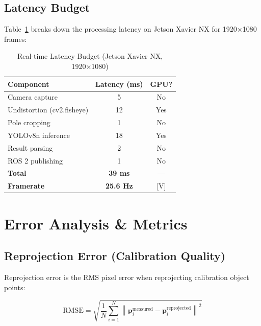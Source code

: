 \documentclass[11pt,a4paper,oneside]{article}
\begin{document}
\subsection{Latency Budget}

Table~\ref{tab:latency} breaks down the processing latency on Jetson Xavier NX for 1920×1080 frames:

\begin{table}[h]
\centering
\caption{Real-time Latency Budget (Jetson Xavier NX, 1920×1080)}
\label{tab:latency}
\begin{tabular}{lcc}
\toprule
\textbf{Component} & \textbf{Latency (ms)} & \textbf{GPU?} \\
\midrule
Camera capture & 5 & No \\
Undistortion (cv2.fisheye) & 12 & Yes \\
Pole cropping & 1 & No \\
YOLOv8n inference & 18 & Yes \\
Result parsing & 2 & No \\
ROS 2 publishing & 1 & No \\
\midrule
\textbf{Total} & \textbf{39 ms} & — \\
\textbf{Framerate} & \textbf{25.6 Hz} & [V] \\
\bottomrule
\end{tabular}
\end{table}


\section{Error Analysis \& Metrics}
\label{sec:analysis}

\subsection{Reprojection Error (Calibration Quality)}

Reprojection error is the RMS pixel error when reprojecting calibration object points:

\begin{equation}
\text{RMSE} = \sqrt{\frac{1}{N} \sum_{i=1}^{N} \left\| \mathbf{p}_i^{\text{measured}} - \mathbf{p}_i^{\text{reprojected}} \right\|^2}
\label{eq:rmse_calib}
\end{equation}
\end{document}
